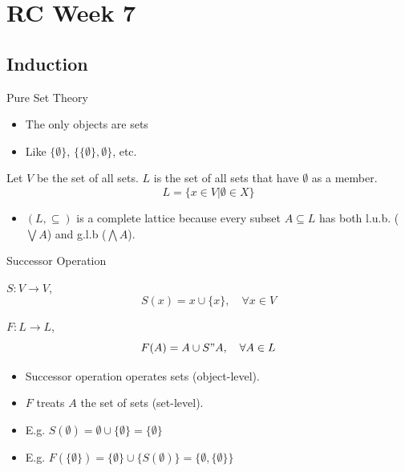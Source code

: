\section{RC Week 7}
\subsection{Induction}
\outline

\begin{frame}{Pure Set Theory}
    \begin{itemize}
        \item The only objects are sets
        \item Like $\{\emptyset\}$, $\{\{\emptyset\},\emptyset\}$, etc.
    \end{itemize}
    \begin{definition}
        Let $V$ be the set of all sets. $L$ is the set of all sets that have $\emptyset$ as a member. $$L=\{x\in V|\emptyset\in X\}$$
    \end{definition}
    \begin{itemize}
        \item $(L,\subseteq)$ is a complete lattice because every subset $A\subseteq L$ has both l.u.b. ($\bigvee A$) and g.l.b ($\bigwedge A$).
    \end{itemize}
\end{frame}

\begin{frame}{Successor Operation}
    \begin{definition}
        $S: V\to V$, $$S(x)=x\cup\{x\},\quad\forall x\in V$$
    \end{definition}
    \begin{definition}
        $F: L\to L$, $$F(A)=A\cup S"A, \quad\forall A\in L$$
    \end{definition}
    \begin{itemize}
        \item Successor operation operates sets (object-level).
        \item $F$ treats $A$ the set of sets (set-level).
        \item E.g. $S(\emptyset)=\emptyset\cup\{\emptyset\}=\{\emptyset\}$
        \item E.g. $F(\{\emptyset\}) = \{\emptyset\}\cup \{S(\emptyset)\}=\{\emptyset, \{\emptyset\}\}$
    \end{itemize}
\end{frame}

